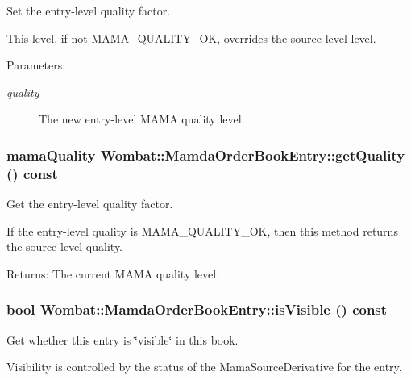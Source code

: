 Set the entry-level quality factor. 

This level, if not MAMA\_\-QUALITY\_\-OK, overrides the source-level level.

\begin{Desc}
\item[Parameters:]
\begin{description}
\item[{\em quality}]The new entry-level MAMA quality level. \end{description}
\end{Desc}
\hypertarget{classWombat_1_1MamdaOrderBookEntry_34dd081ea5b06781ec96a86e211ba2b0}{
\subsubsection[getQuality]{\setlength{\rightskip}{0pt plus 5cm}mama\-Quality Wombat::Mamda\-Order\-Book\-Entry::get\-Quality () const}}
\label{classWombat_1_1MamdaOrderBookEntry_34dd081ea5b06781ec96a86e211ba2b0}


Get the entry-level quality factor. 

If the entry-level quality is MAMA\_\-QUALITY\_\-OK, then this method returns the source-level quality.

\begin{Desc}
\item[Returns:]The current MAMA quality level. \end{Desc}
\hypertarget{classWombat_1_1MamdaOrderBookEntry_1080d7c9464713e1b9171b105cd27190}{
\subsubsection[isVisible]{\setlength{\rightskip}{0pt plus 5cm}bool Wombat::Mamda\-Order\-Book\-Entry::is\-Visible () const}}
\label{classWombat_1_1MamdaOrderBookEntry_1080d7c9464713e1b9171b105cd27190}


Get whether this entry is \char`\"{}visible\char`\"{} in this book. 

Visibility is controlled by the status of the Mama\-Source\-Derivative for the entry.

